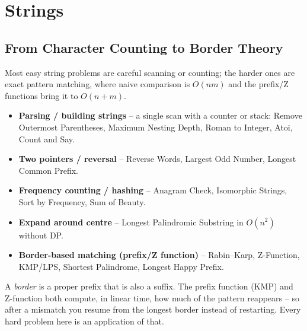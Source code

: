 \chapter{Strings}

\section{From Character Counting to Border Theory}
\label{sec:strings-intro}

Most easy string problems are careful scanning or counting; the harder ones
are exact pattern matching, where naive comparison is $O(nm)$ and the
prefix/Z functions bring it to $O(n+m)$.

\begin{patternbox}
\begin{itemize}
  \item \textbf{Parsing / building strings} -- a single scan with a
        counter or stack: Remove Outermost Parentheses, Maximum Nesting
        Depth, Roman to Integer, Atoi, Count and Say.
  \item \textbf{Two pointers / reversal} -- Reverse Words, Largest Odd
        Number, Longest Common Prefix.
  \item \textbf{Frequency counting / hashing} -- Anagram Check, Isomorphic
        Strings, Sort by Frequency, Sum of Beauty.
  \item \textbf{Expand around centre} -- Longest Palindromic Substring in
        $O(n^2)$ without DP.
  \item \textbf{Border-based matching (prefix/Z function)} -- Rabin--Karp,
        Z-Function, KMP/LPS, Shortest Palindrome, Longest Happy Prefix.
  \end{itemize}
\end{patternbox}

\begin{ideabox}
A \emph{border} is a proper prefix that is also a suffix. The prefix
function (KMP) and Z-function both compute, in linear time, how much of the
pattern reappears -- so after a mismatch you resume from the longest border
instead of restarting. Every hard problem here is an application of that.
\end{ideabox}

